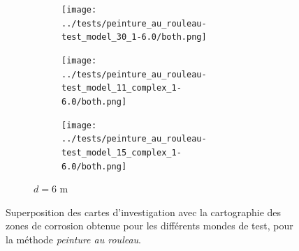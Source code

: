 \documentclass[francais,RandD]{rapportPFE}
\begin{document}
\begin{figure}[H]
\begin{subfigure}[t]{\linewidth}
\begin{subfigure}[t]{0.11\linewidth}
					\texttt{[image: ../tests/peinture\_au\_rouleau-test\_model\_30\_1-6.0/both.png]}
				\end{subfigure}
				\hfill
				\begin{subfigure}[t]{0.11\linewidth}
					\texttt{[image: ../tests/peinture\_au\_rouleau-test\_model\_11\_complex\_1-6.0/both.png]}
				\end{subfigure}
				\hfill
				\begin{subfigure}[t]{0.11\linewidth}
					\texttt{[image: ../tests/peinture\_au\_rouleau-test\_model\_15\_complex\_1-6.0/both.png]}
				\end{subfigure}
				\caption{$d = 6$ m}
			\end{subfigure}
			\caption{Superposition des cartes d'investigation avec la cartographie des zones de corrosion obtenue pour les différents mondes de test, pour la méthode \textit{peinture au rouleau}.}
			\label{fig:peinture_au_rouleau_resultats}
		\end{figure}
\end{document}
